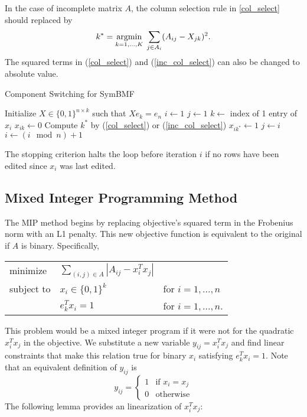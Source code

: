 In the case of incomplete matrix $A$, the column selection rule in
\ref{col_select} should replaced by
\begin{equation} \label{inc_col_select}
k^* = \underset{k = 1,...,K}{\mathrm{arg min}}\; \sum_{j \in A_i} (A_{ij} - X_{jk})^2.
\end{equation}
The squared terms in (\ref{col_select}) and (\ref{inc_col_select}) can
also be changed to absolute value.

\begin{algorithm}
\caption{Component Switching for SymBMF}
\begin{algorithmic}[1]
\State Initialize $X \in \{0, 1\}^{n \times k}$ such that $X e_k = e_n$
\State $i \gets 1$
\State $j \gets 1$
\Repeat
  \State $k \gets$ index of 1 entry of $x_i$
  \State $x_{ik} \gets 0$
  \State Compute $k^*$ by (\ref{col_select}) or (\ref{inc_col_select})
  \State $x_{ik^*} \gets 1$
   
    \State $j \gets i$
  \EndIf
  \State $i \gets (i \mod n) + 1$
\end{algorithmic}
\end{algorithm}

The stopping criterion halts the loop before iteration $i$ if no rows
have been edited since $x_i$ was last edited.


\subsection{Mixed Integer Programming Method}

The MIP method begins by replacing objective's squared term in the
Frobenius norm with an L1 penalty. This new objective function is
equivalent to the original if $A$ is binary. Specifically,
\begin{center}
\begin{tabular}{l l l}
minimize   & $\sum_{(i,j) \in A} |A_{ij} - x_i^T x_j|$ \\
subject to & $x_i \in \{0, 1\}^k$ & for $i = 1, ..., n$ \\
           & $e_k^T x_i = 1$ & for $i = 1, ..., n$.
\end{tabular}
\end{center}
This problem would be a mixed integer program if it were not for the
quadratic $x_i^T x_j$ in the objective. We substitute a new variable
$y_{ij} = x_i^T x_j$ and find linear constraints that make this
relation true for binary $x_i$ satisfying $e_k^T x_i = 1$.
Note that an equivalent definition of
$y_{ij}$ is
\[ y_{ij} = \begin{cases}
  1 & \text{if } x_i = x_j \\
  0 & \text{otherwise}
\end{cases}\]
The following lemma provides an linearization of $x_i^T x_j$:

